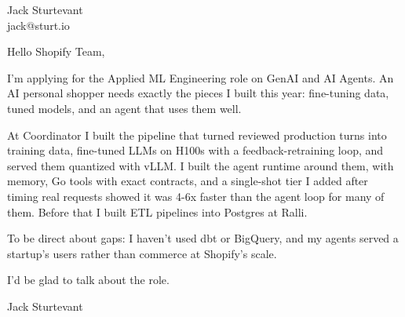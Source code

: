 \documentclass[11pt]{article}
\begin{document}
\raggedright

{\namefont\fontsize{20pt}{24pt}\selectfont Jack Sturtevant}\\[-0.3em]
jack@sturt.io

\vspace{1.2em}

Hello Shopify Team,

I'm applying for the Applied ML Engineering role on GenAI and AI Agents. An AI personal shopper needs exactly the pieces I built this year: fine-tuning data, tuned models, and an agent that uses them well.

At Coordinator I built the pipeline that turned reviewed production turns into training data, fine-tuned LLMs on H100s with a feedback-retraining loop, and served them quantized with vLLM. I built the agent runtime around them, with memory, Go tools with exact contracts, and a single-shot tier I added after timing real requests showed it was 4-6x faster than the agent loop for many of them. Before that I built ETL pipelines into Postgres at Ralli.

To be direct about gaps: I haven't used dbt or BigQuery, and my agents served a startup's users rather than commerce at Shopify's scale.

I'd be glad to talk about the role.

\vspace{0.6em}
Jack Sturtevant
\end{document}
